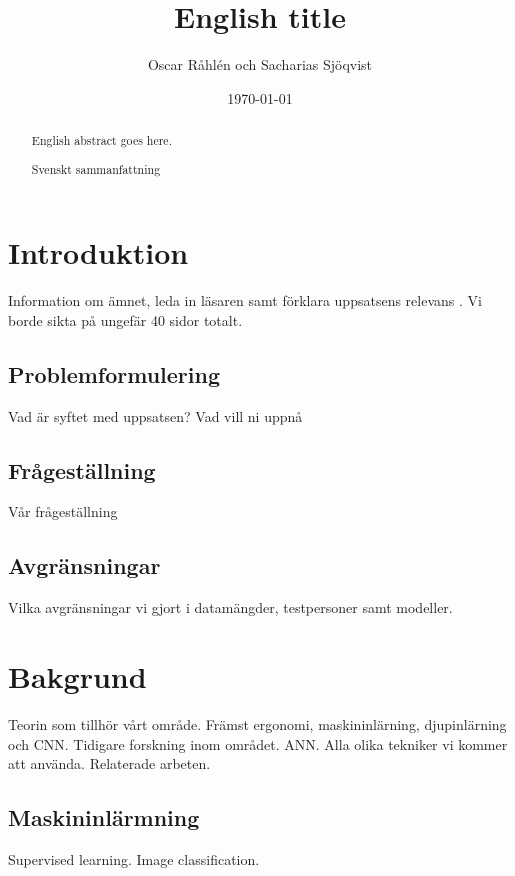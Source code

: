 \documentclass{kththesis}
\title{English title}
\author{Oscar Råhlén och Sacharias Sjöqvist}
\date{\today}
\begin{document}
\frontmatter

\titlepage

\begin{abstract}
  English abstract goes here.
\end{abstract}

\begin{otherlanguage}{swedish}
  \begin{abstract}
    Svenskt sammanfattning
  \end{abstract}
\end{otherlanguage}

\tableofcontents

\mainmatter


\chapter{Introduktion}
Information om ämnet, leda in läsaren samt förklara uppsatsens relevans \parencite{heisenberg2015}. 
Vi borde sikta på ungefär 40 sidor totalt.

  \section{Problemformulering}
  Vad är syftet med uppsatsen? Vad vill ni uppnå

  \section{Frågeställning}
  Vår frågeställning

  \section{Avgränsningar}
  Vilka avgränsningar vi gjort i datamängder, testpersoner samt modeller.

\chapter{Bakgrund}
Teorin som tillhör vårt område. Främst ergonomi, maskininlärning, djupinlärning och CNN. Tidigare forskning inom området. ANN. 
Alla olika tekniker vi kommer att använda. Relaterade arbeten. 

  \section{Maskininlärmning}
  Supervised learning. Image classification.
\end{document}
